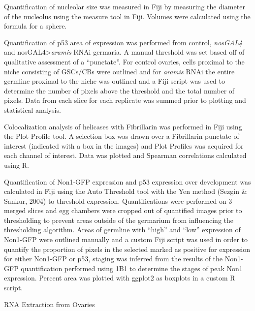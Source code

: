 \documentclass[12pt,twoside]{reedthesis}
\begin{document}
Quantification of nucleolar size was measured in Fiji by measuring the
diameter of the nucleolus using the measure tool in Fiji. Volumes were
calculated using the formula for a sphere.

Quantification of p53 area of expression was performed from control,
\emph{nosGAL4} and nosGAL4\textgreater{}\emph{aramis} RNAi germaria. A manual threshold was
set based off of qualitative assessment of a ``punctate''. For control
ovaries, cells proximal to the niche consisting of GSCs/CBs were
outlined and for \emph{aramis} RNAi the entire germline proximal to the niche
was outlined and a Fiji script was used to determine the number of
pixels above the threshold and the total number of pixels. Data from
each slice for each replicate was summed prior to plotting and
statistical analysis.

Colocalization analysis of helicases with Fibrillarin was performed in
Fiji using the Plot Profile tool. A selection box was drawn over a
Fibrillarin punctate of interest (indicated with a box in the images)
and Plot Profiles was acquired for each channel of interest. Data was
plotted and Spearman correlations calculated using R.

Quantification of Non1-GFP expression and p53 expression over
development was calculated in Fiji using the Auto Threshold tool with
the Yen method (Sezgin \& Sankur, 2004) to threshold
expression. Quantifications were performed on 3 merged slices and egg
chambers were cropped out of quantified images prior to thresholding to
prevent areas outside of the germarium from influencing the thresholding
algorithm. Areas of germline with ``high'' and ``low'' expression of
Non1-GFP were outlined manually and a custom Fiji script was used in
order to quantify the proportion of pixels in the selected marked as
positive for expression for either Non1-GFP or p53, staging was inferred
from the results of the Non1-GFP quantification performed using 1B1 to
determine the stages of peak Non1 expression. Percent area was plotted
with ggplot2 as boxplots in a custom R script.

{RNA Extraction from Ovaries}
\end{document}
